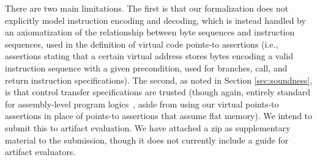 \documentclass[acmsmall,screen,nonacm,review,anonymous]{acmart}
\begin{document}
There are two main limitations.
The first is that our formalization does not explicitly model instruction
encoding and decoding, which is instead handled by an axiomatization of the relationship between
byte sequences and instruction sequences, used in the definition of virtual code points-to
assertions (i.e., assertions stating that a certain virtual address stores bytes
encoding a valid instruction sequence with a given precondition, used for branches, call, and return instruction
specifications). The second, as noted in Section \ref{sec:soundness}, is that control transfer
specifications are trusted (though again, entirely standard for assembly-level program logics~\cite{ni2007contexts,Ni2006codeptrs},
aside from using our virtual points-to assertions in place of points-to assertions that assume flat memory).
We intend to submit this to artifact evaluation.
We have attached a zip as supplementary material to the submission, though it does not
currently include
a guide for artifact evaluators.




\appendix


\end{document}
